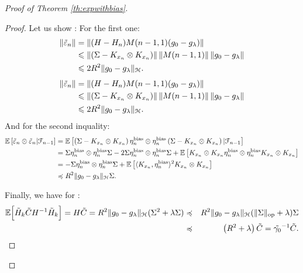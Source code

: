 \begin{proof}[Proof of Theorem \ref{th:expwithbias}]
\begin{proof}
Let us show :
For the first one:
\begin{align*}
\|\tilde{\varepsilon}_n\| &= \left\|(H-H_n)M(n-1,1)(g_0-g_\lambda)\right\| \\
&\leqslant \left\|(\Sigma-K_{x_n}\otimes K_{x_n})\right\|\left\|M(n-1,1)\right\|\left\|g_0-g_\lambda\right\| \\
&\leqslant 2 R^2 \|g_0-g_\lambda\|_{\mathcal H}.
\end{align*}
\begin{align*}
\|\tilde{\varepsilon}_n\| &= \left\|(H-H_n)M(n-1,1)(g_0-g_\lambda)\right\| \\
&\leqslant \left\|(\Sigma-K_{x_n}\otimes K_{x_n})\right\|\left\|M(n-1,1)\right\|\left\|g_0-g_\lambda\right\| \\
&\leqslant 2 R^2 \|g_0-g_\lambda\|_{\mathcal H}.
\end{align*}
And for the second inquality:
\begin{align*}
{\mathbb E} \left[\tilde{\varepsilon}_n \otimes \tilde{\varepsilon}_n | {\mathcal F}_{n-1}\right]&= {\mathbb E} \left[\left(\Sigma - K_{x_n}\otimes K_{x_n}\right)\eta_n^{\textrm {bias}}\otimes \eta_n^{\textrm {bias}} \left(\Sigma - K_{x_n}\otimes K_{x_n}\right)| {\mathcal F}_{n-1}\right] \\
&= \Sigma \eta_n^{\textrm {bias}} \otimes \eta_n^{\textrm {bias}} \Sigma - 2 \Sigma \eta_n^{\textrm {bias}}\otimes \eta_n^{\textrm {bias}} \Sigma + {\mathbb E}\left[ K_{x_n}\otimes K_{x_n} \eta_n^{\textrm {bias}}\otimes \eta_n^{\textrm {bias}}  K_{x_n}\otimes K_{x_n}    \right] \\
&= - \Sigma \eta_n^{\textrm {bias}}\otimes \eta_n^{\textrm {bias}} \Sigma +   {\mathbb E}\left[ \langle K_{x_n} , \eta_n^{\textrm {bias}} \rangle^2 K_{x_n}\otimes K_{x_n}   \right] \\
&\preccurlyeq R^2 \|g_0 - g_\lambda\|_{\mathcal H} \Sigma.
\end{align*}

Finally, we have for  :
\begin{eqnarray*}
{\mathbb E} \Big[ \tilde{H}_k \tilde{C} H^{-1} \tilde{H}_k \Big] = H \tilde{C} = R^2 \|g_0 - g_\lambda\|_{\mathcal H} (\Sigma^2 + \lambda \Sigma)  &\preccurlyeq& R^2 \|g_0 - g_\lambda\|_{\mathcal H} (\|\Sigma\|_{\textrm {op}} + \lambda ) \Sigma  \\
 &\preccurlyeq&
\left(R^2 + \lambda\right) \tilde{C} = \tilde{\gamma_0}^{-1} \tilde{C} .
\end{eqnarray*}

\end{proof}


\end{proof}
